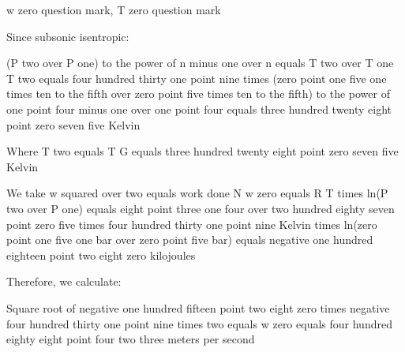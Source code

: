 w zero question mark, T zero question mark

Since subsonic isentropic:

(P two over P one) to the power of n minus one over n equals T two over T one  
T two equals four hundred thirty one point nine times (zero point one five one times ten to the fifth over zero point five times ten to the fifth) to the power of one point four minus one over one point four equals three hundred twenty eight point zero seven five Kelvin  

Where T two equals T G equals three hundred twenty eight point zero seven five Kelvin  

We take w squared over two equals work done  
N w zero equals R T times ln(P two over P one) equals eight point three one four over two hundred eighty seven point zero five times four hundred thirty one point nine Kelvin times ln(zero point one five one bar over zero point five bar) equals negative one hundred eighteen point two eight zero kilojoules  

Therefore, we calculate:

Square root of negative one hundred fifteen point two eight zero times negative four hundred thirty one point nine times two equals w zero equals four hundred eighty eight point four two three meters per second